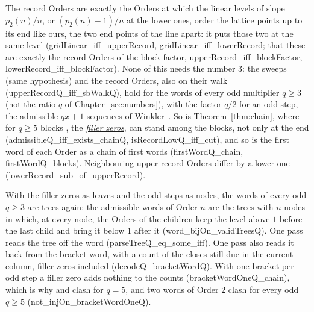 \documentclass[11pt,a4paper,titlepage]{article}
\makeatletter
\newcommand{\termhere}[1]{\leavevmode
  \Hy@raisedlink{\hyper@anchorstart{term:#1}\hyper@anchorend}}
\newcommand{\keyterm}[2]{\hyperlink{box:#1}{\emph{#2}}}
\newcommand{\lean}[1]{\textsf{#1}}
\makeatother
\begin{document}
The record Orders are exactly the Orders at which the linear levels of
slope $p_2(n)/n$, or $(p_2(n) - 1)/n$ at the lower ones, order the lattice points
up to its end like ours, the two end points of the line apart: it puts those two at the same
level (\lean{gridLinear\_iff\_upperRecord},
\lean{gridLinear\_iff\_lowerRecord}; that these are exactly the record Orders of the block
factor, \lean{upperRecord\_iff\_blockFactor}, \lean{lowerRecord\_iff\_blockFactor}).
None of this needs the number $3$: the sweeps (same hypothesis) and the record Orders, also on
their walk (\lean{upperRecordQ\_iff\_sbWalkQ}), hold
for the words of every odd multiplier $q \ge 3$ (not the ratio $q$ of Chapter~\ref{sec:numbers}), with the factor $q/2$ for an odd step, the
admissible $qx+1$ sequences of Winkler~\cite{Winkler2026b}. \termhere{fillerzero}So is Theorem~\ref{thm:chain}, where for $q \ge 5$ blocks , the \keyterm{fillerzero}{filler zeros}, can
stand among the blocks, not only at the end (\lean{admissibleQ\_iff\_exists\_chainQ},
\lean{isRecordLowQ\_iff\_cut}), and so
is the first word of each Order as a chain of first words (\lean{firstWordQ\_chain},
\lean{firstWordQ\_blocks}). Neighbouring
upper record Orders differ by a lower one (\lean{lowerRecord\_sub\_of\_upperRecord}).

With the filler zeros as leaves and the odd steps as nodes, the words of every odd $q \ge 3$
are trees again: the admissible words of Order $n$ are the trees with $n$ nodes in which,
at every node, the Orders of the children keep the level above $1$ before the last child
and bring it below $1$ after it (\lean{word\_bijOn\_validTreesQ}). One pass reads the
tree off the word (\lean{parseTreeQ\_eq\_some\_iff}). One pass also reads it back from the
bracket word, with a count of the closes still due in the current column, filler zeros
included (\lean{decodeQ\_bracketWordQ}). With one bracket per odd step a filler zero adds
nothing to the counts (\lean{bracketWordOneQ\_chain}), which is why  and
 clash for $q = 5$, and two words of Order $2$ clash for every odd $q \ge 5$
(\lean{not\_injOn\_bracketWordOneQ}).
\end{document}
